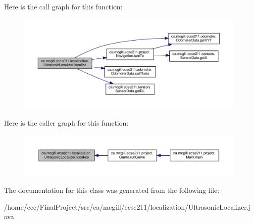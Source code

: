 Here is the call graph for this function\+:
\nopagebreak
\begin{figure}[H]
\begin{center}
\leavevmode
\includegraphics[width=350pt]{classca_1_1mcgill_1_1ecse211_1_1localization_1_1_ultrasonic_localizer_ab78196997d7409aec0c35603686989ad_cgraph}
\end{center}
\end{figure}
Here is the caller graph for this function\+:
\nopagebreak
\begin{figure}[H]
\begin{center}
\leavevmode
\includegraphics[width=350pt]{classca_1_1mcgill_1_1ecse211_1_1localization_1_1_ultrasonic_localizer_ab78196997d7409aec0c35603686989ad_icgraph}
\end{center}
\end{figure}


The documentation for this class was generated from the following file\+:\begin{DoxyCompactItemize}
\item 
/home/ccc/\+Final\+Project/src/ca/mcgill/ecse211/localization/Ultrasonic\+Localizer.\+java\end{DoxyCompactItemize}
